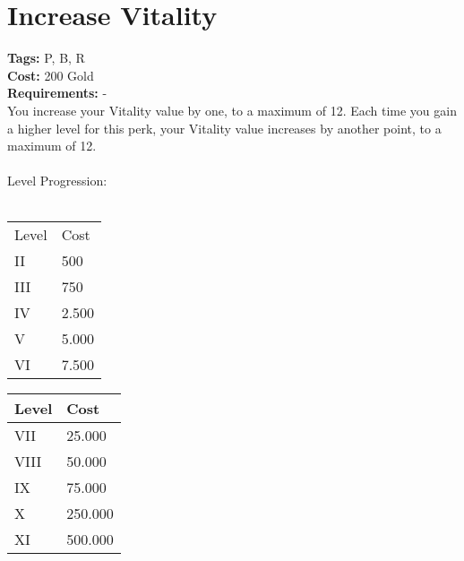 \section{Increase Vitality}\label{sec:increasevitality}
\textbf{Tags:} P, B, R\\
\textbf{Cost:} 200 Gold\\
\textbf{Requirements:} -\\
You increase your Vitality value by one, to a maximum of 12.
Each time you gain a higher level for this perk, your Vitality value increases by another point, to a maximum of 12.\\
\\
Level Progression:\\
\\
\begin{minipage}{0.5\textwidth}
    \begin{tabular}{l | l}
        Level & Cost\\
        II & 500\\
        III & 750\\
        IV & 2.500\\
        V & 5.000\\
        VI & 7.500\\
    \end{tabular}
\end{minipage}
\begin{minipage}{0.5\textwidth}
    \begin{tabular}{l | l}
        Level & Cost\\ \hline
        VII & 25.000\\
        VIII & 50.000\\
        IX & 75.000\\
        X & 250.000\\
        XI & 500.000\\
    \end{tabular}
\end{minipage}